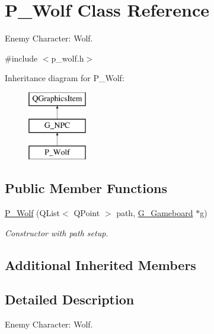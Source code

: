 \hypertarget{class_p___wolf}{}\section{P\+\_\+\+Wolf Class Reference}
\label{class_p___wolf}


Enemy Character\+: Wolf.  




{\ttfamily \#include $<$p\+\_\+wolf.\+h$>$}

Inheritance diagram for P\+\_\+\+Wolf\+:\begin{figure}[H]
\begin{center}
\leavevmode
\includegraphics[height=3.000000cm]{class_p___wolf}
\end{center}
\end{figure}
\subsection*{Public Member Functions}
\begin{DoxyCompactItemize}
\item 
\hyperlink{class_p___wolf_a11be678cb2cabbba514d4b030a5084e4}{P\+\_\+\+Wolf} (Q\+List$<$ Q\+Point $>$ path, \hyperlink{class_g___gameboard}{G\+\_\+\+Gameboard} $\ast$g)
\begin{DoxyCompactList}\small\item\em Constructor with path setup. \end{DoxyCompactList}\end{DoxyCompactItemize}
\subsection*{Additional Inherited Members}


\subsection{Detailed Description}
Enemy Character\+: Wolf. 

